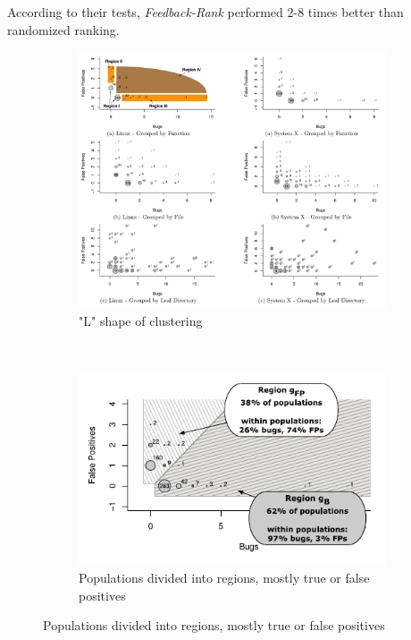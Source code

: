 \documentclass{article}
\begin{document}
 According to their tests, \textit{Feedback-Rank} performed 2-8 times better than randomized ranking.\\

 \begin{figure}[H]
     \begin{subfigure}{1\textwidth}
         \centering
         \includegraphics[scale=0.4]{./src/feedback_rank_l_shape.png}
         \caption{"L" shape of clustering}\label{fr:lshape}
     \end{subfigure}\\
     \begin{subfigure}{.5\textwidth}
         \centering
         \includegraphics[scale=0.6]{./src/feedback_rank_partition.png}
         \caption{Populations divided into regions, mostly true or false positives}\label{fr:partition}

\end{subfigure}
\end{figure}
\end{document}
